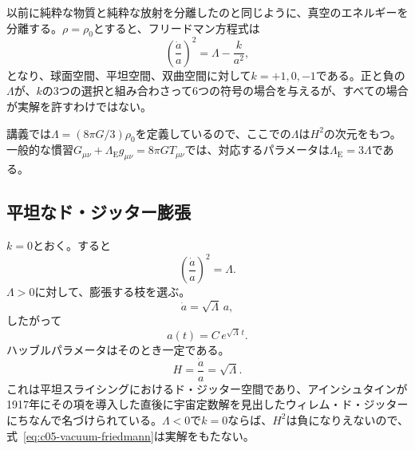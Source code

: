 以前に純粋な物質と純粋な放射を分離したのと同じように、真空のエネルギーを分離する。\(\rho=\rho_0\)とすると、フリードマン方程式は
\begin{equation}
\left(\frac{\dot a}{a}\right)^2=\Lambda-\frac{k}{a^2},
\label{eq:c05-vacuum-friedmann}
\end{equation}
となり、球面空間、平坦空間、双曲空間に対して\(k=+1,0,-1\)である。正と負の\(\Lambda\)が、\(k\)の3つの選択と組み合わさって6つの符号の場合を与えるが、すべての場合が実解を許すわけではない。

\begin{remark}
講義では\(\Lambda=(8\pi G/3)\rho_0\)を定義しているので、ここでの\(\Lambda\)は\(H^2\)の次元をもつ。一般的な慣習\(G_{\mu\nu}+\Lambda_{\mathrm E}g_{\mu\nu}=8\pi G T_{\mu\nu}\)では、対応するパラメータは\(\Lambda_{\mathrm E}=3\Lambda\)である。
\end{remark}

\subsection{平坦なド・ジッター膨張}

\(k=0\)とおく。すると
\begin{equation}
\left(\frac{\dot a}{a}\right)^2=\Lambda.
\end{equation}
\(\Lambda>0\)に対して、膨張する枝を選ぶ。
\begin{equation}
\dot a=\sqrt{\Lambda}\,a,
\end{equation}
したがって
\begin{equation}
a(t)=C\,e^{\sqrt{\Lambda}\,t}.
\end{equation}
ハッブルパラメータはそのとき一定である。
\begin{equation}
H=\frac{\dot a}{a}=\sqrt{\Lambda}.
\end{equation}
これは平坦スライシングにおけるド・ジッター空間であり、アインシュタインが1917年にその項を導入した直後に宇宙定数解を見出したウィレム・ド・ジッターにちなんで名づけられている。\(\Lambda<0\)で\(k=0\)ならば、\(H^2\)は負になりえないので、式~\eqref{eq:c05-vacuum-friedmann}は実解をもたない。

\begin{classroomqa}
\end{classroomqa}

